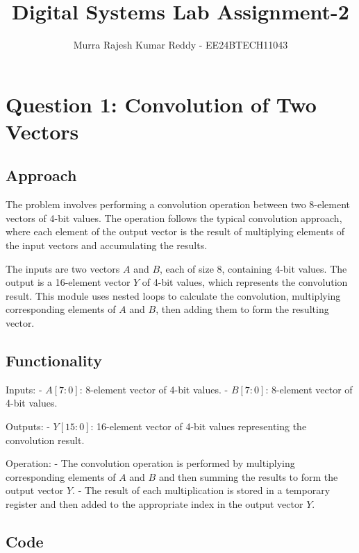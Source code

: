 \documentclass{article}
\title{Digital Systems Lab Assignment-2}
\author{Murra Rajesh Kumar Reddy - EE24BTECH11043}
\date{}
\begin{document}
\maketitle

\section*{Question 1: Convolution of Two Vectors}

\subsection*{Approach}

The problem involves performing a convolution operation between two 8-element vectors of 4-bit values. The operation follows the typical convolution approach, where each element of the output vector is the result of multiplying elements of the input vectors and accumulating the results. 

The inputs are two vectors \( A \) and \( B \), each of size 8, containing 4-bit values. The output is a 16-element vector \( Y \) of 4-bit values, which represents the convolution result. This module uses nested loops to calculate the convolution, multiplying corresponding elements of \( A \) and \( B \), then adding them to form the resulting vector.

\subsection*{Functionality}

Inputs: 
  - \( A[7:0] \): 8-element vector of 4-bit values.
  - \( B[7:0] \): 8-element vector of 4-bit values.

Outputs: 
  - \( Y[15:0] \): 16-element vector of 4-bit values representing the convolution result.

Operation:
  - The convolution operation is performed by multiplying corresponding elements of \( A \) and \( B \) and then summing the results to form the output vector \( Y \).
  - The result of each multiplication is stored in a temporary register and then added to the appropriate index in the output vector \( Y \).

\subsection*{Code}
\end{document}
